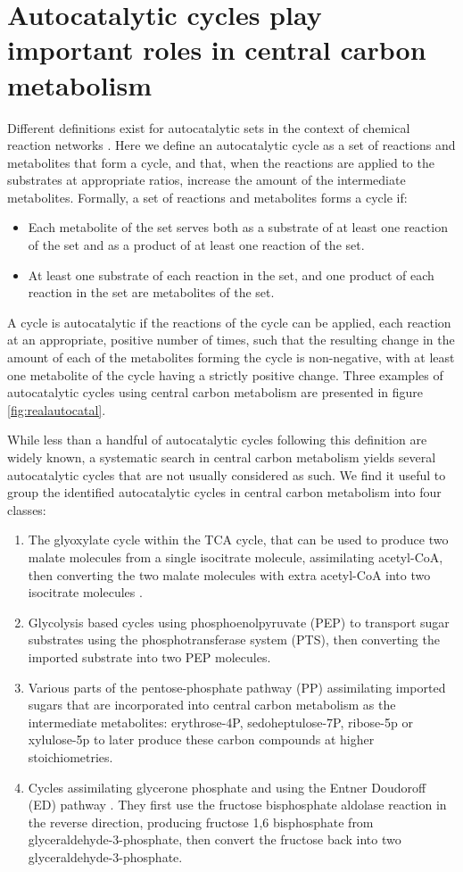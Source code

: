 \documentclass[a4page,notitlepage]{article}
\begin{document}
\section{Autocatalytic cycles play important roles in central carbon metabolism}
Different definitions exist for autocatalytic sets in the context of chemical reaction networks \cite{Hordijk2004-xe, Eigen2012-ti, Kun2008-xg}.
Here we define an autocatalytic cycle as a set of reactions and metabolites that form a cycle, and that, when the reactions are applied to the substrates at appropriate ratios, increase the amount of the intermediate metabolites.
Formally, a set of reactions and metabolites forms a cycle if:
\begin{itemize}
    \item Each metabolite of the set serves both as a substrate of at least one reaction of the set and as a product of at least one reaction of the set.
    \item At least one substrate of each reaction in the set, and one product of each reaction in the set are metabolites of the set.
\end{itemize}
A cycle is autocatalytic if the reactions of the cycle can be applied, each reaction at an appropriate, positive number of times, such that the resulting change in the amount of each of the metabolites forming the cycle is non-negative, with at least one metabolite of the cycle having a strictly positive change.
Three examples of autocatalytic cycles using central carbon metabolism are presented in figure \ref{fig:realautocatal}.

While less than a handful of autocatalytic cycles following this definition are widely known, a systematic search in central carbon metabolism yields several autocatalytic cycles that are not usually considered as such.
We find it useful to group the identified autocatalytic cycles in central carbon metabolism into four classes:
\begin{enumerate}
    \item The glyoxylate cycle within the TCA cycle, that can be used to produce two malate molecules from a single isocitrate molecule, assimilating acetyl-CoA, then converting the two malate molecules with extra acetyl-CoA into two isocitrate molecules \cite{Kornberg1966-lh}.
    \item Glycolysis based cycles using phosphoenolpyruvate (PEP) to transport sugar substrates using the phosphotransferase system (PTS), then converting the imported substrate into two PEP molecules.
    \item Various parts of the pentose-phosphate pathway (PP) assimilating imported sugars that are incorporated into central carbon metabolism as the intermediate metabolites: erythrose-4P, sedoheptulose-7P, ribose-5p or xylulose-5p to later produce these carbon compounds at higher stoichiometries.
    \item Cycles assimilating glycerone phosphate and using the Entner Doudoroff (ED) pathway \cite{Entner1952-xs}. They first use the fructose bisphosphate aldolase reaction in the reverse direction, producing fructose 1,6 bisphosphate from glyceraldehyde-3-phosphate, then convert the fructose back into two glyceraldehyde-3-phosphate.
\end{enumerate}
\end{document}
